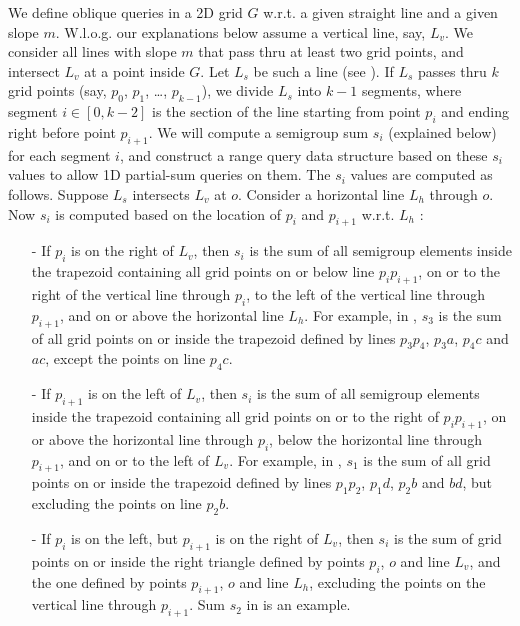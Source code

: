 We define oblique queries in a 2D grid $G$ w.r.t. a given straight line
and a given slope $m$.  W.l.o.g. our explanations below assume a vertical
line, say, $L_v$. We consider all lines with slope $m$ that pass thru
at least two grid points, and intersect $L_v$ at a point inside $G$.
Let $L_s$ be such a line (see ).  If $L_s$
passes thru $k$ grid points (say, $p_0$, $p_1$, \ldots, $p_{k-1}$),
we divide $L_s$ into $k - 1$ segments, where segment $i \in [0, k - 2]$
is the section of the line starting from point $p_i$ and ending right
before point $p_{i+1}$. We will compute a semigroup sum $s_i$ (explained
below) for each segment $i$, and construct a range query data structure
based on these $s_i$ values to allow 1D partial-sum queries on them.
The $s_i$ values are computed as follows. Suppose $L_s$ intersects
$L_v$ at $o$. Consider a horizontal line $L_h$ through $o$. Now $s_i$
is computed based on the location of $p_i$ and $p_{i + 1}$ w.r.t. $L_h$
:
%
\begin{itemize}
%
\item[-] If $p_i$ is on the right of $L_v$, then $s_i$ is the sum of all
semigroup elements inside the trapezoid containing all grid points on or
below line $p_i p_{i+1}$, on or to the right of the vertical line through
$p_i$, to the left of the vertical line through $p_{i+1}$, and on or above
the horizontal line $L_h$. For example, in ,
$s_3$ is the sum of all grid points on or inside the trapezoid defined
by lines $p_3 p_4$, $p_3 a$, $p_4 c$ and $ac$, except the points on line
$p_4 c$.
%
\item[-] If $p_{i+1}$ is on the left of $L_v$, then $s_i$ is the sum of
all semigroup elements inside the trapezoid containing all grid points on
or to the right of $p_i p_{i+1}$, on or above the horizontal line through
$p_i$, below the horizontal line through $p_{i+1}$, and on or to the left
of $L_v$. For example, in , $s_1$ is the
sum of all grid points on or inside the trapezoid defined by lines $p_1
p_2$, $p_1 d$, $p_2 b$ and $bd$, but excluding the points on line $p_2 b$.
%
\item[-] If $p_{i}$ is on the left, but $p_{i+1}$ is on the right
of $L_v$, then $s_i$ is the sum of grid points on or inside the
right triangle defined by points $p_i$, $o$ and line $L_v$, and
the one defined by points $p_{i+1}$, $o$ and line $L_h$, excluding
the points on the vertical line through $p_{i + 1}$. Sum $s_2$ in
 is an example.
%
\end{itemize}

